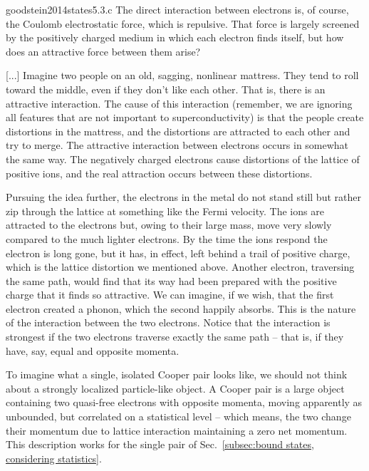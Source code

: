 \begin{cit}{goodstein2014states}{5.3.c}
	The direct interaction between electrons is, of course, the Coulomb electrostatic force, which is repulsive. That force is largely screened by the positively charged medium in which each electron finds itself, but how does an attractive force between them arise? 
	
	[...] Imagine two people on an old, sagging, nonlinear mattress. They tend to roll toward the middle, even if they don't like each other. That is, there is an attractive interaction. The cause of this interaction (remember, we are ignoring all features that are not important to superconductivity) is that the people create distortions in the mattress, and the distortions are attracted to each other and try to merge. The attractive interaction between electrons occurs in somewhat the same way. The negatively charged electrons cause distortions of the lattice of positive ions, and the real attraction occurs between these distortions.
	
	Pursuing the idea further, the electrons in the metal do not stand still but rather zip through the lattice at something like the Fermi velocity. The ions are attracted to the electrons but, owing to their large mass, move very slowly compared to the much lighter electrons. By the time the ions respond the electron is long gone, but it has, in effect, left behind a trail of positive charge, which is the lattice distortion we mentioned above. Another electron, traversing the same path, would find that its way had been prepared with the positive charge that it finds so attractive. We can imagine, if we wish, that the first electron created a phonon, which the second happily absorbs. This is the nature of the interaction between the two electrons. Notice that the interaction is strongest if the two electrons traverse exactly the same path -- that is, if they have, say, equal and opposite momenta.
\end{cit}

To imagine what a single, isolated Cooper pair looks like, we should not think about a strongly localized particle-like object. A Cooper pair is a large object containing two quasi-free electrons with opposite momenta, moving apparently as unbounded, but correlated on a statistical level -- which means, the two change their momentum due to lattice interaction maintaining a zero net momentum. This description works for the single pair of Sec.~\ref{subsec:bound states, considering statistics}.

